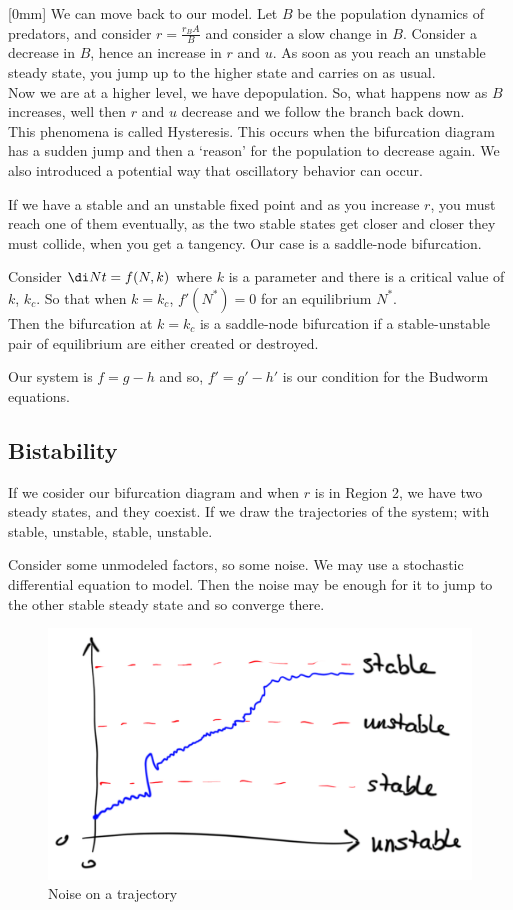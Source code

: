 [0mm]
We can move back to our model. Let $B$ be the population dynamics of predators, and consider $r = \frac{r_B A}{B}$ and consider a slow change in $B$. Consider a decrease in $B$, hence an increase in $r$ and $u$. As soon as you reach an unstable steady state, you jump up to the higher state and carries on as usual.\\


Now we are at a higher level, we have depopulation. So, what happens now as $B$ increases, well then $r$ and $u$ decrease and we follow the branch back down.\\

This phenomena is called Hysteresis. This occurs when the bifurcation diagram has a sudden jump and then a `reason' for the population to decrease again. We also introduced a potential way that oscillatory behavior can occur.

If we have a stable and an unstable fixed point and as you increase $r$, you must reach one of them eventually, as the two stable states get closer and closer they must collide, when you get a tangency. Our case is a saddle-node bifurcation.\\

\begin{ndefi}
  Consider $\di N t = f(N, k)$ where $k$ is a parameter and there is a critical value of $k$, $k_c$. So that when $k = k_c$, $f'(N^*) = 0$ for an equilibrium $N^*$. \\

  Then the bifurcation at $k = k_c$ is a saddle-node bifurcation if a stable-unstable pair of equilibrium are either created or destroyed.
\end{ndefi}

Our system is $f = g - h$ and so, $f' = g' - h'$ is our condition for the Budworm equations.

\subsection{Bistability}
If we cosider our bifurcation diagram and when $r$ is in Region 2, we have two steady states, and they coexist. If we draw the trajectories of the system; with stable, unstable, stable, unstable.

Consider some unmodeled factors, so some noise. We may use a stochastic differential equation to model. Then the noise may be enough for it to jump to the other stable steady state and so converge there.

\begin{figure}[!ht]
\centering
\includegraphics{./figures/L6.1}
\caption{Noise on a trajectory}
\end{figure}
